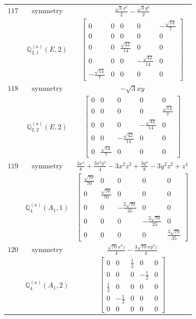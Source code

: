 \documentclass[fleqn,8pt,landscape]{jsarticle}
\begin{document}
\begin{longtable}{ccc}
$ 117 $ & $ \text{symmetry} $ & $ \frac{\sqrt{3} x^{2}}{2} - \frac{\sqrt{3} y^{2}}{2} $ \\
$  $ & $ \mathbb{Q}_{2,1}^{(a)}(E,2) $ & $ \begin{bmatrix} 0 & 0 & 0 & 0 & - \frac{\sqrt{14}}{7} \\ 0 & 0 & 0 & 0 & 0 \\ 0 & 0 & \frac{\sqrt{42}}{14} & 0 & 0 \\ 0 & 0 & 0 & - \frac{\sqrt{42}}{14} & 0 \\ - \frac{\sqrt{14}}{7} & 0 & 0 & 0 & 0 \end{bmatrix} $ \\ \hline
$ 118 $ & $ \text{symmetry} $ & $ - \sqrt{3} x y $ \\
$  $ & $ \mathbb{Q}_{2,2}^{(a)}(E,2) $ & $ \begin{bmatrix} 0 & 0 & 0 & 0 & 0 \\ 0 & 0 & 0 & 0 & \frac{\sqrt{14}}{7} \\ 0 & 0 & 0 & - \frac{\sqrt{42}}{14} & 0 \\ 0 & 0 & - \frac{\sqrt{42}}{14} & 0 & 0 \\ 0 & \frac{\sqrt{14}}{7} & 0 & 0 & 0 \end{bmatrix} $ \\ \hline
$ 119 $ & $ \text{symmetry} $ & $ \frac{3 x^{4}}{8} + \frac{3 x^{2} y^{2}}{4} - 3 x^{2} z^{2} + \frac{3 y^{4}}{8} - 3 y^{2} z^{2} + z^{4} $ \\
$  $ & $ \mathbb{Q}_{4}^{(a)}(A_{1},1) $ & $ \begin{bmatrix} \frac{\sqrt{70}}{70} & 0 & 0 & 0 & 0 \\ 0 & \frac{\sqrt{70}}{70} & 0 & 0 & 0 \\ 0 & 0 & - \frac{2 \sqrt{70}}{35} & 0 & 0 \\ 0 & 0 & 0 & - \frac{2 \sqrt{70}}{35} & 0 \\ 0 & 0 & 0 & 0 & \frac{3 \sqrt{70}}{35} \end{bmatrix} $ \\ \hline
$ 120 $ & $ \text{symmetry} $ & $ \frac{\sqrt{70} x^{3} z}{4} - \frac{3 \sqrt{70} x y^{2} z}{4} $ \\
$  $ & $ \mathbb{Q}_{4}^{(a)}(A_{1},2) $ & $ \begin{bmatrix} 0 & 0 & \frac{1}{2} & 0 & 0 \\ 0 & 0 & 0 & - \frac{1}{2} & 0 \\ \frac{1}{2} & 0 & 0 & 0 & 0 \\ 0 & - \frac{1}{2} & 0 & 0 & 0 \\ 0 & 0 & 0 & 0 & 0 \end{bmatrix} $ \\ \hline

\end{longtable}
\end{document}
